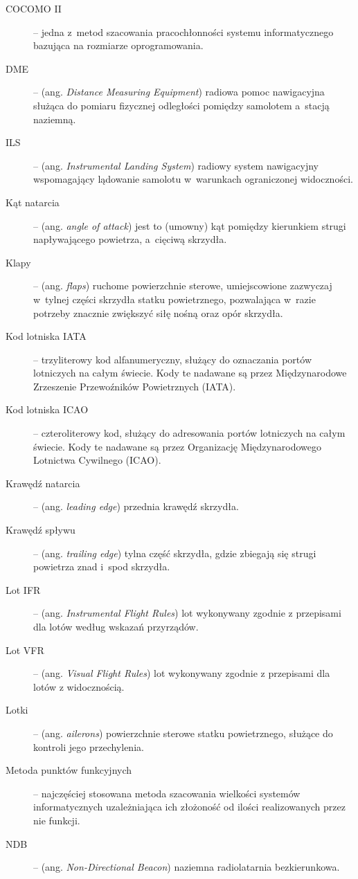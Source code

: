 \documentclass{mwrep}
\begin{document}
\begin{description}
\item[COCOMO II] -- jedna z~metod szacowania pracochłonności systemu informatycznego bazująca na rozmiarze oprogramowania.
\item[DME] -- (ang. \emph{Distance Measuring Equipment}) radiowa pomoc nawigacyjna służąca do pomiaru fizycznej odległości pomiędzy samolotem a~stacją naziemną.
\item[ILS] -- (ang. \emph{Instrumental Landing System}) radiowy system nawigacyjny wspomagający lądowanie samolotu w~warunkach ograniczonej widoczności.
\item[Kąt natarcia] -- (ang. \emph{angle of attack}) jest to (umowny) kąt pomiędzy kierunkiem strugi napływającego powietrza, a~cięciwą skrzydła.
\item[Klapy] -- (ang. \emph{flaps}) ruchome powierzchnie sterowe, umiejscowione zazwyczaj w~tylnej części skrzydła statku powietrznego, pozwalająca w~razie potrzeby znacznie zwiększyć siłę nośną oraz opór skrzydła.
\item[Kod lotniska IATA] -- trzyliterowy kod alfanumeryczny, służący do oznaczania portów lotniczych na całym świecie. Kody te nadawane są przez Międzynarodowe Zrzeszenie Przewoźników Powietrznych (IATA).
\item[Kod lotniska ICAO] -- czteroliterowy kod, służący do adresowania portów lotniczych na całym świecie. Kody te nadawane są przez Organizację Międzynarodowego Lotnictwa Cywilnego (ICAO).
\item[Krawędź natarcia] -- (ang. \emph{leading edge}) przednia krawędź skrzydła.
\item[Krawędź spływu] -- (ang. \emph{trailing edge}) tylna część skrzydła, gdzie zbiegają się strugi powietrza znad i~spod skrzydła.
\item[Lot IFR] -- (ang. \emph{Instrumental Flight Rules}) lot wykonywany zgodnie z przepisami dla lotów według wskazań przyrządów.
\item[Lot VFR] -- (ang. \emph{Visual Flight Rules}) lot wykonywany zgodnie z przepisami dla lotów z widocznością.
\item[Lotki] -- (ang. \emph{ailerons}) powierzchnie sterowe statku powietrznego, służące do kontroli jego przechylenia.
\item[Metoda punktów funkcyjnych] -- najczęściej stosowana metoda szacowania wielkości systemów informatycznych uzależniająca ich złożoność od ilości realizowanych przez nie funkcji.
\item[NDB] -- (ang. \emph{Non-Directional Beacon}) naziemna radiolatarnia bezkierunkowa.

\end{description}
\end{document}
